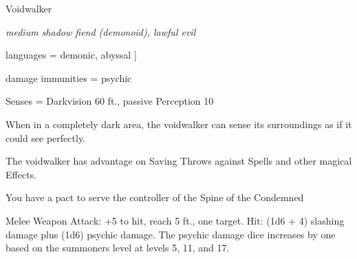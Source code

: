 \begin{monsterbox}{Voidwalker}
	\begin{hangingpar}
		\textit{medium shadow fiend (demonoid), lawful evil}
	\end{hangingpar}
	\dndline%
	\basics[armorclass = summoners AC +3, hitpoints = 30 + 4 $\times$ player level, speed = 30 ft]
	\dndline%
	\stats[STR = \stat{19}, DEX = \stat{12}, CON = \stat{18}, INT = \stat{10}, WIS = \stat{10},	CHA = \stat{10}]
	\dndline
	languages = {demonic, abyssal}
	]
	
	\dndline%
	damage immunities = psychic
	
	Senses = Darkvision 60 ft., passive Perception 10
	
	\dndline%
	\begin{monsteraction}
		When in a completely dark area, the voidwalker can sense its surroundings as if it could see perfectly.
	\end{monsteraction}	
	\begin{monsteraction}
		The voidwalker has advantage on Saving Throws against Spells and other magical Effects.
	\end{monsteraction}	
	\begin{monsteraction}
		You have a pact to serve the controller of the Spine of the Condemned
	\end{monsteraction}	
	\begin{monsteraction}
		Melee Weapon Attack: +5 to hit, reach 5 ft., one target. Hit: (1d6 + 4) slashing damage plus (1d6) psychic damage. The psychic damage dice increases by one based on the summoners level at levels 5, 11, and 17.
	\end{monsteraction}	
\end{monsterbox}

